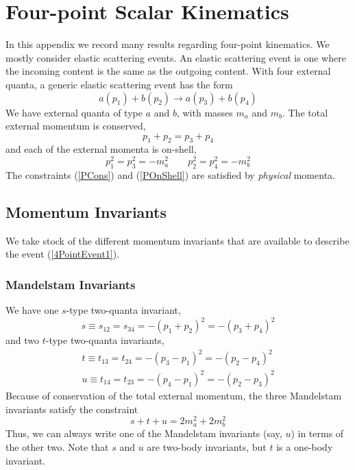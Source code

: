 \chapter{Four-point Scalar Kinematics\label{AppKin4}}
In this appendix we record many results regarding four-point kinematics. We mostly consider elastic scattering events. An elastic scattering event is one where the incoming content is the same as the outgoing content. With four external quanta, a generic elastic scattering event has the form
\begin{equation}
	a(p_{1}) + b(p_{2}) \longrightarrow a(p_{3}) + b(p_{4}) \label{4PointEvent1}
\end{equation}
We have external quanta of type $a$ and $b$, with masses $m_{a}$ and $m_{b}$. The total external momentum is conserved,
\begin{equation}
	p_{1} + p_{2} = p_{3} + p_{4} \label{PCons}
\end{equation}
and each of the external momenta is on-shell,
\begin{equation}
	p_{1}^{2} = p_{3}^{2} = -m_{a}^{2} \qquad p_{2}^{2} = p_{4}^{2} = -m_{b}^{2} \label{POnShell}
\end{equation}
The constraints (\ref{PCons}) and (\ref{POnShell}) are satisfied by \textit{physical} momenta.
\section{Momentum Invariants}
We take stock of the different momentum invariants that are available to describe the event (\ref{4PointEvent1}).
\subsection{Mandelstam Invariants}
We have one $s$-type two-quanta invariant,
\begin{equation}
	s \equiv s_{12} = s_{34} = - (p_{1} + p_{2})^{2} = - (p_{3} + p_{4})^{2}
\end{equation}
and two $t$-type two-quanta invariants,
\begin{align}
	t \equiv t_{13} = t_{24} = - (p_{3} - p_{1})^{2} = - (p_{2} - p_{4})^{2} \\
	u \equiv t_{14} = t_{23} = - (p_{4} - p_{1})^{2} = - (p_{2} - p_{3})^{2}
\end{align}
Because of conservation of the total external momentum, the three Mandelstam invariants satisfy the constraint
\begin{equation}
	s + t + u = 2 m_{a}^{2} + 2 m_{b}^{2} \label{stuConstraint}
\end{equation}
Thus, we can always write one of the Mandelstam invariants (say, $u$) in terms of the other two. Note that $s$ and $u$ are two-body invariants, but $t$ is a one-body invariant.
